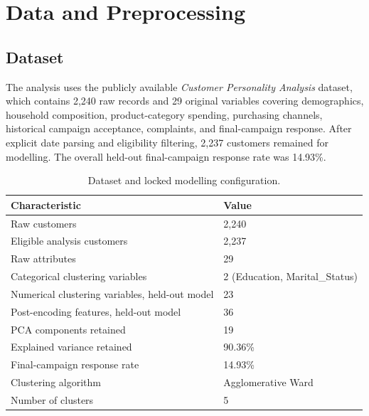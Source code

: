 \documentclass[10pt]{article}
\begin{document}
\section{Data and Preprocessing}
\subsection{Dataset}
The analysis uses the publicly available \textit{Customer Personality Analysis} dataset, which contains 2,240 raw records and 29 original variables covering demographics, household composition, product-category spending, purchasing channels, historical campaign acceptance, complaints, and final-campaign response. After explicit date parsing and eligibility filtering, 2,237 customers remained for modelling. The overall held-out final-campaign response rate was 14.93\%.

\begin{table}[!ht]
\centering
\caption{Dataset and locked modelling configuration.}
\label{tab:dataset_overview}
\begin{tabular}{ll}
\toprule
\textbf{Characteristic} & \textbf{Value} \\
\midrule
Raw customers & 2,240 \\
Eligible analysis customers & 2,237 \\
Raw attributes & 29 \\
Categorical clustering variables & 2 (Education, Marital\_Status) \\
Numerical clustering variables, held-out model & 23 \\
Post-encoding features, held-out model & 36 \\
PCA components retained & 19 \\
Explained variance retained & 90.36\% \\
Final-campaign response rate & 14.93\% \\
Clustering algorithm & Agglomerative Ward \\
Number of clusters & 5 \\
\bottomrule
\end{tabular}
\end{table}
\end{document}
